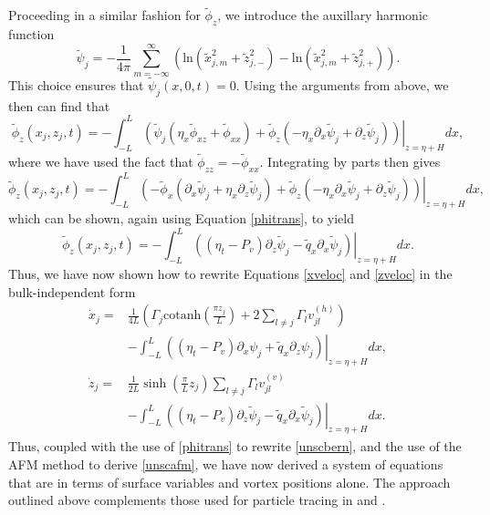 \documentclass[a4paper,11pt]{article}
\newcommand{\p}{\partial}
\begin{document}
Proceeding in a similar fashion for $\tilde{\phi}_{z}$, we introduce the auxillary harmonic function
\[
\tilde{\psi}_{j} = -\frac{1}{4\pi}\sum_{m=-\infty}^{\infty} \left( \mbox{ln}\left( \tilde{x}_{j,m}^{2} + \tilde{z}_{j,-}^{2}  \right) - \mbox{ln}\left( \tilde{x}_{j,m}^{2} + \tilde{z}_{j,+}^{2} \right)\right).
\]
This choice ensures that $\tilde{\psi}_{j}(x,0,t) = 0$.  Using the arguments from above, we then can find that
\[
\tilde{\phi}_{z}(x_{j},z_{j},t) = -\int_{-L}^{L}\left.\left( \tilde{\psi}_{j}\left(\eta_{x}\tilde{\phi}_{xz}+\tilde{\phi}_{xx}\right)+\tilde{\phi}_{z}\left(-\eta_{x}\p_{x}\tilde{\psi}_{j}+\p_{z}\tilde{\psi}_{j}\right) \right)\right|_{z=\eta+H} dx ,
\]
where we have used the fact that $\tilde{\phi}_{zz} = -\tilde{\phi}_{xx}$.  Integrating by parts then gives 
\[
\tilde{\phi}_{z}(x_{j},z_{j},t) = -\int_{-L}^{L}\left.\left(-\tilde{\phi}_{x}\left(\p_{x} \tilde{\psi}_{j} + \eta_{x}\p_{z} \tilde{\psi}_{j}\right) +\tilde{\phi}_{z}\left(-\eta_{x}\p_{x} \tilde{\psi}_{j}+\p_{z}\tilde{\psi}_{j}\right)\right)\right|_{z=\eta+H}dx,
\]
which can be shown, again using Equation \eqref{phitrans}, to yield
\[
\tilde{\phi}_{z}(x_{j},z_{j},t) = -\int_{-L}^{L}\left.\left( \left(\eta_{t}-P_{v}\right)\p_{z}\tilde{\psi}_{j} - \tilde{q}_{x}\p_{x}\tilde{\psi}_{j} \right)\right|_{z=\eta+H} dx.
\]
Thus, we have now shown how to rewrite Equations \eqref{xveloc} and \eqref{zveloc} in the bulk-independent form 
\begin{align}
\dot{x}_{j} = & \frac{1}{4L}\left(  \Gamma_{j}\mbox{cotanh}\left(\frac{\pi z_{j}}{L} \right)+2\sum_{l\neq j}\Gamma_{l}v_{jl}^{(h)} \right)\nonumber\\
&  -\int_{-L}^{L}\left.\left(\left(\eta_{t}-P_{v}\right)\p_{x}\psi_{j} + \tilde{q}_{x}\p_{z}\psi_{j} \right)\right|_{z=\eta + H} dx, \label{xdotb}\\
\dot{z}_{j} = &  \frac{1}{2L}\sinh\left(\frac{\pi}{L}z_{j}\right)\sum_{l\neq j} \Gamma_{l} v_{jl}^{(v)}\nonumber\\
& - \int_{-L}^{L}\left.\left( \left(\eta_{t}-P_{v}\right)\p_{z}\tilde{\psi}_{j} - \tilde{q}_{x}\p_{x}\tilde{\psi}_{j} \right)\right|_{z=\eta + H} dx. \label{zdotb}
\end{align}
Thus, coupled with the use of \eqref{phitrans} to rewrite \eqref{unscbern}, and the use of the AFM method to derive \eqref{unscafm}, we have now derived a system of equations that are in terms of surface variables and vortex positions alone.  The approach outlined above complements those used for particle tracing in \cite{kalisch} and \cite{nachbin}.  
\end{document}

